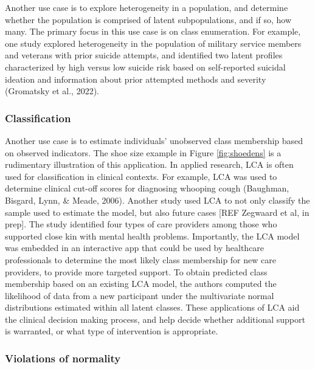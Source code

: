 \documentclass[
  ,man,floatsintext]{apa6}
\begin{document}
Another use case is to explore heterogeneity in a population,
and determine whether the population is comprised of latent subpopulations, and if so, how many.
The primary focus in this use case is on class enumeration.
For example,
one study explored heterogeneity in the population of military service members and veterans with prior suicide attempts,
and identified two latent profiles characterized by high versus low suicide risk based on self-reported suicidal ideation and information about prior attempted methods and severity
(Gromatsky et al., 2022).

\hypertarget{classification}{%
\subsubsection{Classification}\label{classification}}

Another use case is to estimate individuals' unobserved class membership based on observed indicators.
The shoe size example in Figure \ref{fig:shoedens}
is a rudimentary illustration of this application.
In applied research, LCA is often used for classification in clinical contexts.
For example, LCA was used to determine clinical cut-off scores for diagnosing whooping cough (Baughman, Bisgard, Lynn, \& Meade, 2006).
Another study used LCA to not only classify the sample used to estimate the model, but also future cases {[}REF Zegwaard et al, in prep{]}.
The study identified four types of care providers among those who supported close kin with mental health problems.
Importantly, the LCA model was embedded in an interactive app that could be used by healthcare professionals to determine the most likely class membership for new care providers, to provide more targeted support.
To obtain predicted class membership based on an existing LCA model,
the authors computed the likelihood of data from a new participant under the multivariate normal distributions estimated within all latent classes.
These applications of LCA aid the clinical decision making process,
and help decide whether additional support is warranted,
or what type of intervention is appropriate.

\hypertarget{violations-of-normality}{%
\subsubsection{Violations of normality}\label{violations-of-normality}}
\end{document}
